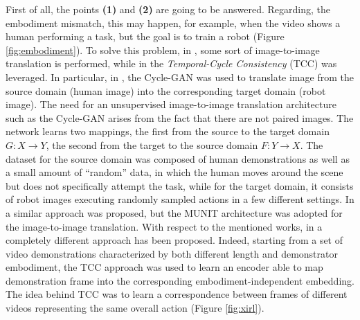 First of all, the points \textbf{(1)} and \textbf{(2)} are going to be answered. Regarding, the embodiment mismatch, this may happen, for example, when the video shows a human performing a task, but the goal is to train a robot (Figure \ref{fig:embodiment}). 
To solve this problem, in \cite{smith2019avid,xiong2021learning_by_watching,li2021meta_watching_video_demonstration}, some sort of image-to-image translation is performed,  while in \cite{zakka2022xirl} the \textit{Temporal-Cycle Consistency} (TCC) \cite{dwibedi2019tcc} was leveraged. In particular, in \cite{smith2019avid,li2021meta_watching_video_demonstration}, the Cycle-GAN \cite{zhu2017cycle_gan} was used to translate image from the source domain (human image) into the corresponding target domain (robot image). The need for an unsupervised image-to-image translation architecture such as the Cycle-GAN arises from the fact that there are not paired images. The network learns two mappings, the first from the source to the target domain $G : X \rightarrow Y$, the second from the target to the source domain $F : Y \rightarrow X$. The dataset for the source domain was composed of human demonstrations as well as a small amount of ``random” data, in which the human moves around the scene but does not specifically attempt the task, while for the target domain, it consists of  robot images executing randomly sampled actions in a few different settings. In \cite{xiong2021learning_by_watching} a similar approach was proposed, but the MUNIT \cite{huang2018munit} architecture was adopted for the image-to-image translation. With respect to the mentioned works, in \cite{zakka2022xirl} a completely different approach has been proposed. Indeed, starting from a set of video demonstrations characterized by both different length and demonstrator embodiment, the TCC approach was used to learn an encoder able to map demonstration frame into the corresponding embodiment-independent embedding. The idea behind TCC was to learn a correspondence between frames of different videos representing the same overall action (Figure \ref{fig:xirl}).

